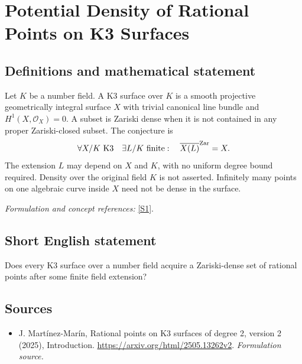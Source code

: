 \documentclass[11pt]{article}
\begin{document}
\section*{\texorpdfstring{Potential Density of Rational Points on K3 Surfaces}{Potential Density of Rational Points on K3 Surfaces}}\label{483}
\subsection{Definitions and mathematical statement}
Let $K$ be a number field. A K3 surface over $K$ is a smooth projective geometrically integral surface $X$ with trivial canonical line bundle and $H^1(X,\mathcal O_X)=0$. A subset is Zariski dense when it is not contained in any proper Zariski-closed subset. The conjecture is
\[
 \forall X/K\text{ K3}\quad\exists L/K\text{ finite}:\quad
 \overline{X(L)}^{\rm Zar}=X.
\]
The extension $L$ may depend on $X$ and $K$, with no uniform degree bound required. Density over the original field $K$ is not asserted. Infinitely many points on one algebraic curve inside $X$ need not be dense in the surface.
\par\smallskip\textit{Formulation and concept references:} \href{https://arxiv.org/html/2505.13262v2}{[S1]}.

\subsection{Short English statement}
Does every K3 surface over a number field acquire a Zariski-dense set of rational points after some finite field extension?
\subsection{Sources}
\begin{itemize}
\item[S1]J. Martínez-Marín, Rational points on K3 surfaces of degree 2, version 2 (2025), Introduction.
\url{https://arxiv.org/html/2505.13262v2}.
\textit{Formulation source.}
\end{itemize}
\end{document}
